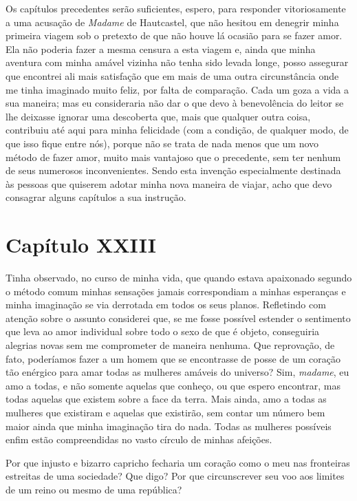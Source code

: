 Os capítulos precedentes serão suficientes, espero, para responder
vitoriosamente a uma acusação de \textit{Madame} de Hautcastel, que não
hesitou em denegrir minha primeira viagem sob o pretexto de que não
houve lá ocasião para se fazer amor. Ela não poderia fazer a mesma
censura a esta viagem e, ainda que minha aventura com minha amável
vizinha não tenha sido levada longe, posso assegurar que encontrei ali
mais satisfação que em mais de uma outra circunstância onde me tinha
imaginado muito feliz, por falta de comparação. Cada um goza a vida a
sua maneira; mas eu consideraria não dar o que devo à benevolência do
leitor se lhe deixasse ignorar uma descoberta que, mais que qualquer
outra coisa, contribuiu até aqui para minha felicidade (com a condição,
de qualquer modo, de que isso fique entre nós), porque não se trata de
nada menos que um novo método de fazer amor, muito mais vantajoso que o
precedente, sem ter nenhum de seus numerosos inconvenientes. Sendo esta
invenção especialmente destinada às pessoas que quiserem adotar minha
nova maneira de viajar, acho que devo consagrar alguns capítulos a sua
instrução. 

\section{Capítulo XXIII}

 Tinha observado, no curso de minha vida, que quando estava apaixonado
segundo o método comum minhas sensações jamais correspondiam a minhas
esperanças e minha imaginação se via derrotada em todos os seus planos.
Refletindo com atenção sobre o assunto considerei que, se me fosse
possível estender o sentimento que leva ao amor individual sobre todo o
sexo de que é objeto, conseguiria alegrias novas sem me comprometer de
maneira nenhuma. Que reprovação, de fato, poderíamos fazer a um homem
que se encontrasse de posse de um coração tão enérgico para amar todas
as mulheres amáveis do universo? Sim, \textit{madame}, eu amo a todas,
e não somente aquelas que conheço, ou que espero encontrar, mas todas
aquelas que existem sobre a face da terra. Mais ainda, amo a todas as
mulheres que existiram e aquelas que existirão, sem contar um número
bem maior ainda que minha imaginação tira do nada. Todas as mulheres
possíveis enfim estão compreendidas no vasto círculo de minhas
afeições.

 Por que injusto e bizarro capricho fecharia um coração como o meu nas
fronteiras estreitas de uma sociedade? Que digo? Por que circunscrever
seu voo aos limites de um reino ou mesmo de uma república? 

